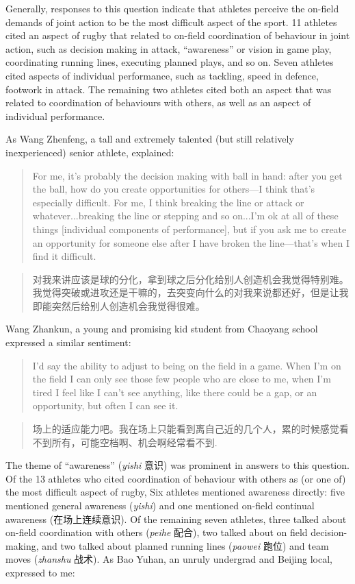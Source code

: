 \begin{CJK}{UTF8}{gbsn}
Generally, responses to this question indicate that athletes perceive the on-field demands of joint action to be the most difficult aspect of the sport.  11 athletes cited an aspect of rugby that related to on-field coordination of behaviour in joint action, such as decision making in attack, ``awareness'' or vision in game play, coordinating running lines, executing planned plays, and so on.  Seven athletes cited aspects of individual performance, such as tackling, speed in defence, footwork in attack. The remaining two athletes cited both an aspect that was related to coordination of behaviours with others, as well as an aspect of individual performance.

As Wang Zhenfeng, a tall and extremely talented (but still relatively inexperienced) senior athlete, explained:

\begin{quote}
  For me, it's probably the decision making with ball in hand: after you get the ball, how do you create opportunities for others---I think that's especially difficult.  For me, I think breaking the line or attack or whatever...breaking the line or stepping and so on...I'm ok at all of these things [individual components of performance], but if you ask me to create an opportunity for someone else after I have broken the line---that's when I find it difficult.
\end{quote}

\begin{quote}
  对我来讲应该是球的分化，拿到球之后分化给别人创造机会我觉得特别难。我觉得突破或进攻还是干嘛的，去突变向什么的对我来说都还好，但是让我即能突然后给别人创造机会我觉得很难。
\end{quote}

Wang Zhankun, a young and promising kid student from Chaoyang school expressed a similar sentiment:

\begin{quote}
  I’d say the ability to adjust to being on the field in a game.  When I’m on the field I can only see those few people who are close to me, when I’m tired I feel like I can’t see anything, like there could be a gap, or an opportunity, but often I can see it.
\end{quote}

\begin{quote}
  场上的适应能力吧。我在场上只能看到离自己近的几个人，累的时候感觉看不到所有，可能空档啊、机会啊经常看不到.
\end{quote}

The theme of ``awareness'' (\textit{yishi} 意识) was prominent in answers to this question. Of the 13 athletes who cited coordination of behaviour with others as (or one of) the most difficult aspect of rugby,  Six athletes mentioned awareness directly: five mentioned general awareness (\textit{yishi}) and one mentioned on-field continual awareness (在场上连续意识).  Of the remaining seven athletes, three talked about on-field coordination with others (\textit{peihe} 配合), two talked about on field decision-making, and two talked about planned running lines (\textit{paowei} 跑位) and team moves (\textit{zhanshu} 战术). As Bao Yuhan, an unruly undergrad and Beijing local, expressed to me:


\end{CJK}
